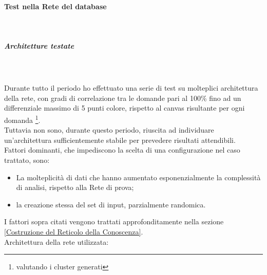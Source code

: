\paragraph{Test nella Rete del database}\mbox{}\\
\label{Test nella Rete del database}
\noindent
\subparagraph{Architetture testate}\mbox{}\\\\
\label{Architetture testate}
\noindent
Durante tutto il periodo ho effettuato una serie di test su molteplici architettura della rete, con gradi di correlazione tra le domande pari al 100\%  fino ad un differenziale massimo di 5 punti colore, rispetto al canvas risultante per ogni domanda \footnote{valutando i cluster generati}.\\
Tuttavia non sono, durante questo periodo, riuscita ad individuare un'architettura sufficientemente stabile per prevedere risultati attendibili.\\
Fattori dominanti, che impediscono la scelta di una configurazione nel caso trattato, sono:
\begin{itemize}
\item La molteplicit\`a di dati che hanno aumentato esponenzialmente  la complessit\`a di analisi, rispetto alla Rete di prova;
\item la creazione stessa del set di input, parzialmente randomica.
\end{itemize}
\noindent
I fattori sopra citati vengono trattati approfonditamente nella sezione \ref{Costruzione del Reticolo della Conoscenza}.\\
\noindent
Architettura della rete utilizzata:
